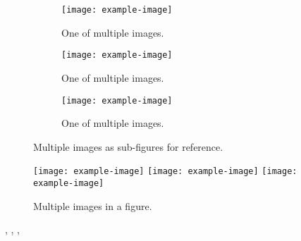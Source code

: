 \documentclass{article}
\begin{document}
\begin{figure}[ht]
    \centering
    \begin{subfigure}{0.32\textwidth}
        \texttt{[image: example-image]}
        \caption{One of multiple images.}
        \label{fig:multiple-images-4}
    \end{subfigure}
    \hfill
    \begin{subfigure}{0.32\textwidth}
        \texttt{[image: example-image]}
        \caption{One of multiple images.}
        \label{fig:multiple-images-5}
    \end{subfigure}
    \hfill
    \begin{subfigure}{0.32\textwidth}
        \texttt{[image: example-image]}
        \caption{One of multiple images.}
        \label{fig:multiple-images-6}
    \end{subfigure}
    \caption{Multiple images as sub-figures for reference.}
\end{figure}

\begin{figure}[ht]
    \centering
    \texttt{[image: example-image]}
    \hfill
    \texttt{[image: example-image]}
    \hfill
    \texttt{[image: example-image]}
    \caption{Multiple images in a figure.}
    \label{fig:multiple-images}
\end{figure}



, , , 
\end{document}
